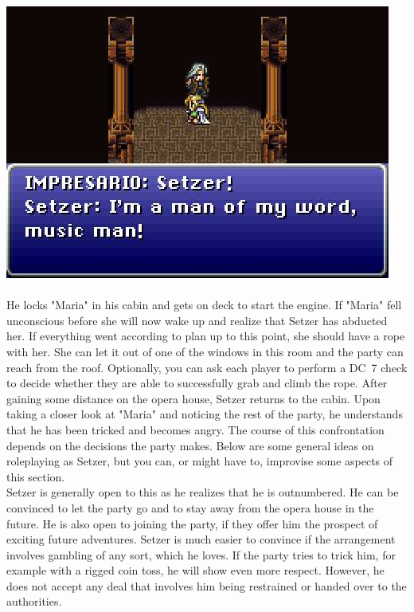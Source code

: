 \includegraphics[width=\columnwidth]{./art/mariaanddraco/setzer.jpg} 
%
\\\\
%
He locks "Maria" in his cabin and gets on deck to start the engine.
If "Maria" fell unconscious before she will now wake up and realize that Setzer has abducted her.
If everything went according to plan up to this point, she should have a rope with her.
She can let it out of one of the windows in this room and the party can reach from the roof. 
Optionally, you can ask each player to perform a DC~7 check to decide whether they are able to successfully grab and climb the rope.
After gaining some distance on the opera house, Setzer returns to the cabin.
Upon taking a closer look at "Maria" and noticing the rest of the party, he understands that he has been tricked and becomes angry.
The course of this confrontation depends on the decisions the party makes.
Below are some general ideas on roleplaying as Setzer, but you can, or might have to, improvise some aspects of this section.
%
\ofpar
%
\\
Setzer is generally open to this as he realizes that he is outnumbered.
He can be convinced to let the party go and to stay away from the opera house in the future.
He is also open to joining the party, if they offer him the prospect of exciting future adventures.
Setzer is much easier to convince if the arrangement involves gambling of any sort, which he loves.
If the party tries to trick him, for example with a rigged coin toss, he will show even more respect.
However, he does not accept any deal that involves him being restrained or handed over to the authorities.
